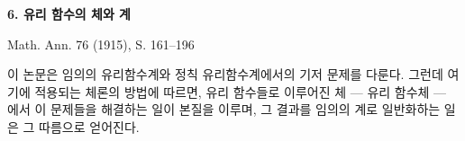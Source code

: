
\begin{center}
{\Large\bfseries 6. 유리 함수의 체와 계}\par
\vspace{1.2em}
Math. Ann. 76 (1915), S. 161--196
\end{center}

\vspace{2em}

이 논문은 임의의 유리함수계와 정칙 유리함수계에서의 기저 문제를 다룬다. 그런데 여기에 적용되는 체론의 방법에 따르면, 유리 함수들로 이루어진 체 --- 유리 함수체 --- 에서 이 문제들을 해결하는 일이 본질을 이루며, 그 결과를 임의의 계로 일반화하는 일은 그 따름으로 얻어진다.
